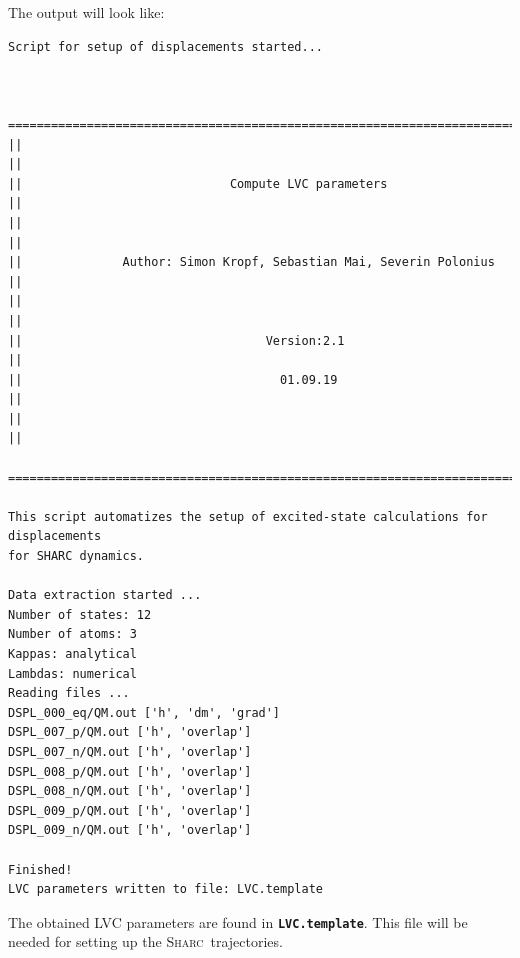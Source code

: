 \documentclass[a4paper,11pt,DIV=15,openany]{scrbook}
\newcommand{\sharc}{\textsc{Sharc}}
\newcommand{\ttt}[1]{\textbf{\texttt{#1}}}
\begin{document}
The output will look like:
\begin{oframed}
\footnotesize\begin{Verbatim}[commandchars=\\\{\}]
  Script for setup of displacements started...


  ================================================================================
||                                                                                ||
||                             Compute LVC parameters                             ||
||                                                                                ||
||              Author: Simon Kropf, Sebastian Mai, Severin Polonius              ||
||                                                                                ||
||                                  Version:2.1                                   ||
||                                    01.09.19                                    ||
||                                                                                ||
  ================================================================================

This script automatizes the setup of excited-state calculations for displacements
for SHARC dynamics.

Data extraction started ...
Number of states: 12
Number of atoms: 3
Kappas: analytical
Lambdas: numerical
Reading files ...
DSPL_000_eq/QM.out ['h', 'dm', 'grad']
DSPL_007_p/QM.out ['h', 'overlap']
DSPL_007_n/QM.out ['h', 'overlap']
DSPL_008_p/QM.out ['h', 'overlap']
DSPL_008_n/QM.out ['h', 'overlap']
DSPL_009_p/QM.out ['h', 'overlap']
DSPL_009_n/QM.out ['h', 'overlap']

Finished!
LVC parameters written to file: LVC.template
\end{Verbatim}
\end{oframed}

\normalsize
The obtained LVC parameters are found in \ttt{LVC.template}.
This file will be needed for setting up the \sharc\ trajectories.
\end{document}
